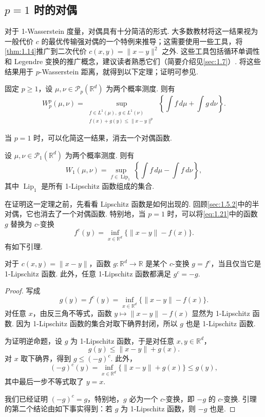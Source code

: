 \subsection{\texorpdfstring{$p=1$}{p=1} 时的对偶}\label{sec:1.6}

对于 1-Wasserstein 度量，对偶具有十分简洁的形式. 大多数教材将这一结果视为一般代价 $c$ 的最优传输强对偶的一个特例来推导；这需要使用一些工具，将\autoref{thm:1.14}推广到二次代价 $c(x,y)=\|x-y\|^2$ 之外. 这些工具包括循环单调性和 Legendre 变换的推广概念，建议读者熟悉它们（简要介绍见\autoref{sec:1.7}）. 将这些结果用于 $p$-Wasserstein 距离，就得到以下定理；证明可参见\cite[第 3.1.1 小节]{ref281}.

\begin{theorem}\label{thm:1.20}
固定 $p\geq1$，设 $\mu,\nu\in\mathcal{P}_p(\mathbb{R}^d)$ 为两个概率测度. 则有
\begin{equation}\label{eq:1.21}
W_p^p(\mu,\nu)
=\sup_{\substack{f\in L^1(\mu),\ g\in L^1(\nu)\\
f(x)+g(y)\leq\|x-y\|^p}}
\left\{\int f\,d\mu+\int g\,d\nu\right\}.
\end{equation}
\end{theorem}

当 $p=1$ 时，可以化简这一结果，消去一个对偶函数.

\begin{theorem}\label{thm:1.21}
设 $\mu,\nu\in\mathcal{P}_1(\mathbb{R}^d)$ 为两个概率测度. 则有
\begin{equation}\label{eq:1.22}
W_1(\mu,\nu)
=\sup_{f\in\operatorname{Lip}_1}
\left\{\int f\,d\mu-\int f\,d\nu\right\},
\end{equation}
其中 $\operatorname{Lip}_1$ 是所有 1-Lipschitz 函数组成的集合.
\end{theorem}

在证明这一定理之前，先看看 Lipschitz 函数是如何出现的. 回顾\autoref{sec:1.5.2}中的半对偶，它也消去了一个对偶函数. 特别地，当 $p=1$ 时，可以将\eqref{eq:1.21}中的函数 $g$ 替换为 $c$-变换
$$
f^c(y)=\inf_{x\in\mathbb{R}^d}\{\|x-y\|-f(x)\}.
$$
有如下引理.

\begin{lemma}\label{lem:1.22}
对于 $c(x,y)=\|x-y\|$，函数 $g:\mathbb{R}^d\to\mathbb{R}$ 是某个 $c$-变换 $g=f^c$，当且仅当它是 1-Lipschitz 函数. 此外，任意 1-Lipschitz 函数都满足 $g^c=-g$.
\end{lemma}
\begin{proof}
写成
$$
g(y)=f^c(y)=\inf_{x\in\mathbb{R}^d}\{\|x-y\|-f(x)\}.
$$
对任意 $x$，由反三角不等式，函数 $y\mapsto\|x-y\|-f(x)$ 显然为 1-Lipschitz 函数. 因为 1-Lipschitz 函数的集合对取下确界封闭，所以 $g$ 也是 1-Lipschitz 函数.

为证明逆命题，设 $g$ 为 1-Lipschitz 函数，于是对任意 $x,y\in\mathbb{R}^d$，
$$
g(y)\leq\|x-y\|+g(x).
$$
对 $x$ 取下确界，得到 $g\leq(-g)^c$. 此外，
$$
(-g)^c(y)=\inf_{x\in\mathbb{R}^d}\{\|x-y\|+g(x)\}\leq g(y),
$$
其中最后一步不等式取了 $y=x$.

我们已经证明 $(-g)^c=g$，特别地，$g$ 必为一个 $c$-变换，即 $-g$ 的 $c$-变换. 引理的第二个结论由如下事实得到：若 $g$ 为 1-Lipschitz 函数，则 $-g$ 也是.
\end{proof}

